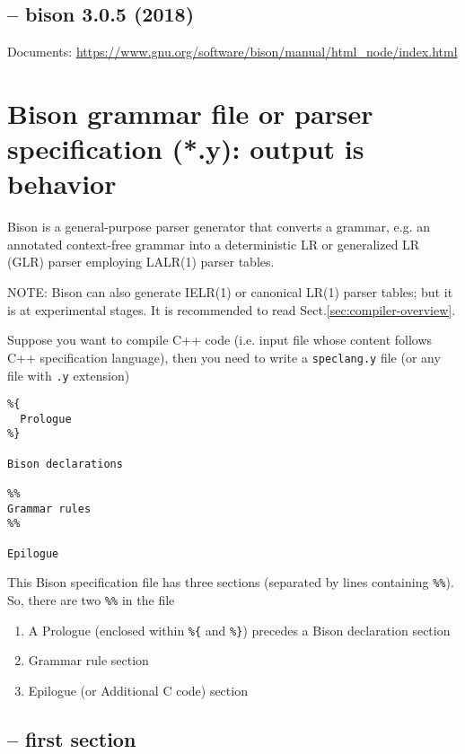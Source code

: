 \subsection{-- bison 3.0.5 (2018)}

Documents: \url{https://www.gnu.org/software/bison/manual/html_node/index.html}

\section{Bison grammar file or parser specification (*.y): output is behavior}
\label{sec:bison-grammar-file}

Bison is a general-purpose parser generator that converts a grammar, e.g. an
annotated context-free grammar into a deterministic LR or generalized LR (GLR)
parser employing LALR(1) parser tables. 

NOTE: Bison can also generate IELR(1) or canonical LR(1) parser tables; but it
is at experimental stages. It is recommended to read Sect.\ref{sec:compiler-overview}.

Suppose you want to compile C++ code (i.e. input file whose content follows C++
specification language), then you need to write a \verb!speclang.y! file (or any file with \verb!.y! extension)

\begin{verbatim}
%{
  Prologue
%}

Bison declarations

%%
Grammar rules
%%

Epilogue
\end{verbatim}

This Bison specification file has three sections (separated by lines containing
\verb!%%!). So, there are two \verb!%%! in the file
\begin{enumerate}
  
  \item A Prologue (enclosed within \verb!%{! and \verb!%}!) precedes a Bison
  declaration section
  
  \item Grammar rule section
  
  \item Epilogue (or Additional C code) section
\end{enumerate}


\subsection{-- first section}
\label{sec:bison-grammar-file-first-section}

